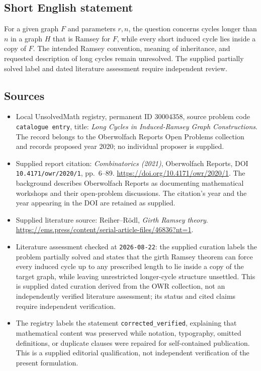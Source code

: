 \documentclass[11pt]{article}
\begin{document}
\subsection{Short English statement}
For a given graph \(F\) and parameters \(r,n\), the question concerns cycles longer than \(n\) in a graph \(H\) that is Ramsey for \(F\), while every short induced cycle lies inside a copy of \(F\). The intended Ramsey convention, meaning of inheritance, and requested description of long cycles remain unresolved. The supplied partially solved label and dated literature assessment require independent review.
\subsection{Sources}
\begin{itemize}
\item Local UnsolvedMath registry, permanent ID \(30004358\), source problem code \texttt{catalogue entry}, title: \emph{Long Cycles in Induced-Ramsey Graph Constructions}. The record belongs to the Oberwolfach Reports Open Problems collection and records proposed year \(2020\); no individual proposer is supplied.
\item Supplied report citation: \emph{Combinatorics (2021)}, Oberwolfach Reports, DOI \texttt{10.4171/owr/2020/1}, pp.\ 6--89. \url{https://doi.org/10.4171/owr/2020/1}. The background describes Oberwolfach Reports as documenting mathematical workshops and their open-problem discussions. The citation's year and the year appearing in the DOI are retained as supplied.
\item Supplied literature source: Reiher--R\"odl, \emph{Girth Ramsey theory}. \url{https://ems.press/content/serial-article-files/46836?nt=1}.
\item Literature assessment checked at \texttt{2026-08-22}: the supplied curation labels the problem partially solved and states that the girth Ramsey theorem can force every induced cycle up to any prescribed length to lie inside a copy of the target graph, while leaving unrestricted longer-cycle structure unsettled. This is supplied dated curation derived from the OWR collection, not an independently verified literature assessment; its status and cited claims require independent verification.
\item The registry labels the statement \texttt{corrected\_verified}, explaining that mathematical content was preserved while notation, typography, omitted definitions, or duplicate clauses were repaired for self-contained publication. This is a supplied editorial qualification, not independent verification of the present formulation.
\end{itemize}
\end{document}
